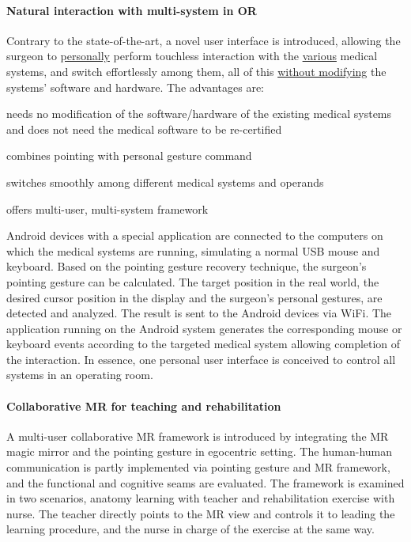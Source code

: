 \paragraph{Natural interaction with multi-system in OR}
Contrary to the state-of-the-art, a novel user interface is introduced, allowing the surgeon to \underline{personally} perform touchless interaction with the \underline{various} medical systems, and switch effortlessly among them, all of this \underline{without modifying} the systems' software and hardware. The advantages are: 

\begin{description} [font=$\bullet$\scshape\bfseries]
	\item needs no modification of the software/hardware of the existing medical systems and does not need the medical software to be re-certified
	\item combines pointing with personal gesture command
	\item switches smoothly among different medical systems and operands
	\item offers multi-user, multi-system framework
\end{description}

Android devices with a special application are connected to the computers on which the medical systems are running, simulating a normal USB mouse and keyboard. 
Based on the pointing gesture recovery technique, the surgeon's pointing gesture can be calculated. The target position in the real world, the desired cursor position in the display and the surgeon's personal gestures, are detected and analyzed. The result is sent to the Android devices via WiFi. The application running on the Android system generates the corresponding mouse or keyboard events according to the targeted medical system allowing completion of the interaction. In essence, one personal user interface is conceived to control all systems in an operating room.

\paragraph{Collaborative MR for teaching and rehabilitation}
A multi-user collaborative MR framework is introduced by integrating the MR magic mirror and the pointing gesture in egocentric setting.
The human-human communication is partly implemented via pointing gesture and MR framework, and the functional and cognitive seams are evaluated.
The framework is examined in two scenarios, anatomy learning with teacher and rehabilitation exercise with nurse. The teacher directly points to the MR view and controls it to leading the learning procedure, and the nurse in charge of the exercise at the same way.

